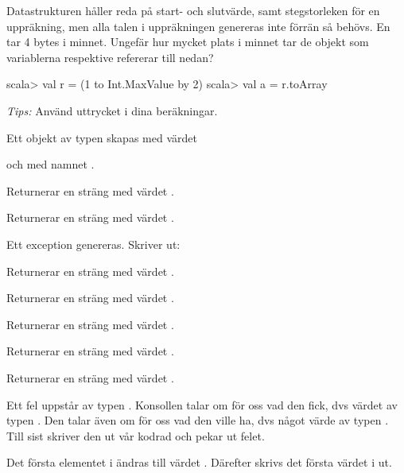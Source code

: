\Subtask {}

\Subtask {}

\Subtask {}

\Subtask {}

\Subtask {}

\Subtask\Pen Datastrukturen  håller reda på start- och slutvärde, samt stegstorleken för en uppräkning, men alla talen i uppräkningen genereras inte förrän så behövs. En  tar 4 bytes i minnet. Ungefär hur mycket plats i minnet tar de objekt som variablerna  respektive  refererar till nedan?
\begin{REPL}
scala> val r = (1 to Int.MaxValue by 2)
scala> val a = r.toArray
\end{REPL}
\emph{Tips:} Använd uttrycket  i dina beräkningar.

\SOLUTION


\TaskSolved \what
 

\SubtaskSolved  Ett objekt av typen  skapas med värdet 

 och med namnet .

\SubtaskSolved  Returnerar en sträng med värdet .

\SubtaskSolved  Returnerar en sträng med värdet \code{!}.

\SubtaskSolved  Ett exception genereras. Skriver ut:


\SubtaskSolved  Returnerar en sträng med värdet .

\SubtaskSolved  Returnerar en sträng med värdet .

\SubtaskSolved  Returnerar en sträng med värdet .

\SubtaskSolved  Returnerar en sträng med värdet .

\SubtaskSolved  Returnerar en sträng med värdet .

\SubtaskSolved  Ett fel uppstår av typen . Konsollen talar om för oss vad den fick, dvs värdet  av typen . Den talar även om för oss vad den ville ha, dvs något värde av typen . Till sist skriver den ut vår kodrad och pekar ut felet.

\SubtaskSolved  Det första elementet i  ändras till värdet . Därefter skrivs det första värdet i  ut.

